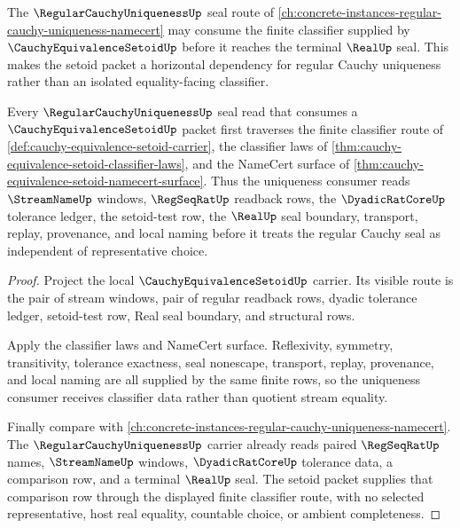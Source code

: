 The $\RegularCauchyUniquenessUp$ seal route of \autoref{ch:concrete-instances-regular-cauchy-uniqueness-namecert} may consume the finite classifier supplied by $\CauchyEquivalenceSetoidUp$ before it reaches the terminal $\RealUp$ seal. This makes the setoid packet a horizontal dependency for regular Cauchy uniqueness rather than an isolated equality-facing classifier.

\begin{theorem}
\label{thm:regular-cauchy-uniqueness-cauchy-equivalence-setoid-route}
Every $\RegularCauchyUniquenessUp$ seal read that consumes a $\CauchyEquivalenceSetoidUp$ packet first traverses the finite classifier route of \autoref{def:cauchy-equivalence-setoid-carrier}, the classifier laws of \autoref{thm:cauchy-equivalence-setoid-classifier-laws}, and the NameCert surface of \autoref{thm:cauchy-equivalence-setoid-namecert-surface}. Thus the uniqueness consumer reads $\StreamNameUp$ windows, $\RegSeqRatUp$ readback rows, the $\DyadicRatCoreUp$ tolerance ledger, the setoid-test row, the $\RealUp$ seal boundary, transport, replay, provenance, and local naming before it treats the regular Cauchy seal as independent of representative choice.
\end{theorem}
\begin{proof}
Project the local $\CauchyEquivalenceSetoidUp$ carrier. Its visible route is the pair of stream windows, pair of regular readback rows, dyadic tolerance ledger, setoid-test row, Real seal boundary, and structural rows.

Apply the classifier laws and NameCert surface. Reflexivity, symmetry, transitivity, tolerance exactness, seal nonescape, transport, replay, provenance, and local naming are all supplied by the same finite rows, so the uniqueness consumer receives classifier data rather than quotient stream equality.

Finally compare with \autoref{ch:concrete-instances-regular-cauchy-uniqueness-namecert}. The $\RegularCauchyUniquenessUp$ carrier already reads paired $\RegSeqRatUp$ names, $\StreamNameUp$ windows, $\DyadicRatCoreUp$ tolerance data, a comparison row, and a terminal $\RealUp$ seal. The setoid packet supplies that comparison row through the displayed finite classifier route, with no selected representative, host real equality, countable choice, or ambient completeness.
\end{proof}
